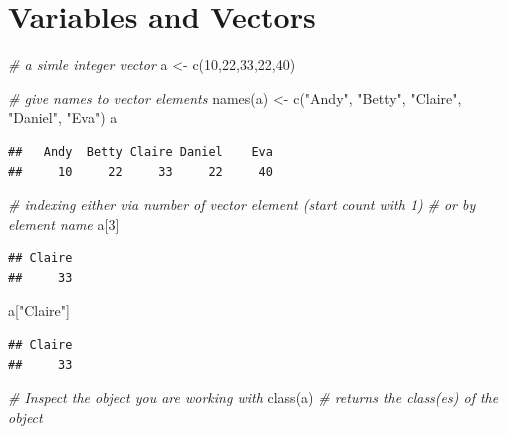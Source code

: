 \documentclass[
  12pt,
]{style/krantz}
\newenvironment{Shaded}{\begin{snugshade}}{\end{snugshade}}
\newcommand{\CommentTok}[1]{\textcolor[rgb]{0.56,0.35,0.01}{\textit{#1}}}
\newcommand{\DecValTok}[1]{\textcolor[rgb]{0.00,0.00,0.81}{#1}}
\newcommand{\FunctionTok}[1]{\textcolor[rgb]{0.00,0.00,0.00}{#1}}
\newcommand{\NormalTok}[1]{#1}
\newcommand{\OtherTok}[1]{\textcolor[rgb]{0.56,0.35,0.01}{#1}}
\newcommand{\StringTok}[1]{\textcolor[rgb]{0.31,0.60,0.02}{#1}}
\begin{document}
\hypertarget{variables-and-vectors}{%
\section{Variables and Vectors}\label{variables-and-vectors}}

\begin{Shaded}
\begin{Highlighting}[]
\CommentTok{\# a simle integer vector}
\NormalTok{a }\OtherTok{\textless{}{-}} \FunctionTok{c}\NormalTok{(}\DecValTok{10}\NormalTok{,}\DecValTok{22}\NormalTok{,}\DecValTok{33}\NormalTok{,}\DecValTok{22}\NormalTok{,}\DecValTok{40}\NormalTok{)}

\CommentTok{\# give names to vector elements}
\FunctionTok{names}\NormalTok{(a) }\OtherTok{\textless{}{-}} \FunctionTok{c}\NormalTok{(}\StringTok{"Andy"}\NormalTok{, }\StringTok{"Betty"}\NormalTok{, }\StringTok{"Claire"}\NormalTok{, }\StringTok{"Daniel"}\NormalTok{, }\StringTok{"Eva"}\NormalTok{)}
\NormalTok{a}
\end{Highlighting}
\end{Shaded}

\begin{verbatim}
##   Andy  Betty Claire Daniel    Eva 
##     10     22     33     22     40
\end{verbatim}

\begin{Shaded}
\begin{Highlighting}[]
\CommentTok{\# indexing either via number of vector element (start count with 1)}
\CommentTok{\# or by element name}
\NormalTok{a[}\DecValTok{3}\NormalTok{]}
\end{Highlighting}
\end{Shaded}

\begin{verbatim}
## Claire 
##     33
\end{verbatim}

\begin{Shaded}
\begin{Highlighting}[]
\NormalTok{a[}\StringTok{"Claire"}\NormalTok{]}
\end{Highlighting}
\end{Shaded}

\begin{verbatim}
## Claire 
##     33
\end{verbatim}

\begin{Shaded}
\begin{Highlighting}[]
\CommentTok{\# Inspect the object you are working with}
\FunctionTok{class}\NormalTok{(a) }\CommentTok{\# returns the class(es) of the object}
\end{Highlighting}
\end{Shaded}
\end{document}
